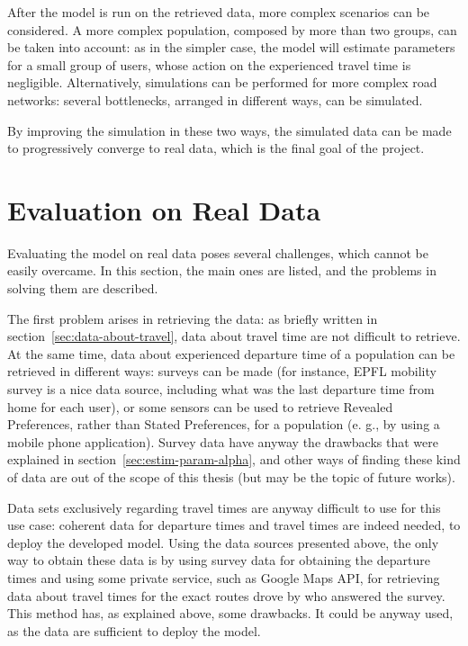 After the model is run on the retrieved data, more complex scenarios can be considered.
A more complex population, composed by more than two groups, can be taken into account:
as in the simpler case, the model will estimate parameters for a small group of users,
whose action on the experienced travel time is negligible.
Alternatively, simulations can be performed for more complex road networks:
several bottlenecks, arranged in different ways, can be simulated.

By improving the simulation in these two ways,
the simulated data can be made to progressively converge to real data,
which is the final goal of the project.

\section{Evaluation on Real Data}
\label{sec:eval_real}

Evaluating the model on real data poses several challenges,
which cannot be easily overcame.
In this section, the main ones are listed, and the problems in solving them are described.

The first problem arises in retrieving the data:
as briefly written in section~\ref{sec:data-about-travel},
data about travel time are not difficult to retrieve.
At the same time, data about experienced departure time of a population can be retrieved in different ways:
surveys can be made (for instance, EPFL mobility survey is a nice data source, including what was the last departure time from home for each user),
or some sensors can be used to retrieve Revealed Preferences, rather than Stated Preferences,
for a population (e. g., by using a mobile phone application).
Survey data have anyway the drawbacks that were explained in section~\ref{sec:estim-param-alpha},
and other ways of finding these kind of data are out of the scope of this thesis
(but may be the topic of future works).

Data sets exclusively regarding travel times are anyway difficult to use for this use case:
coherent data for departure times and travel times are indeed needed,
to deploy the developed model.
Using the data sources presented above,
the only way to obtain these data is by using survey data for obtaining the departure times and using some private service,
such as Google Maps API,
for retrieving data about travel times for the exact routes drove by who answered the survey.
This method has, as explained above, some drawbacks.
It could be anyway used, as the data are sufficient to deploy the model.


